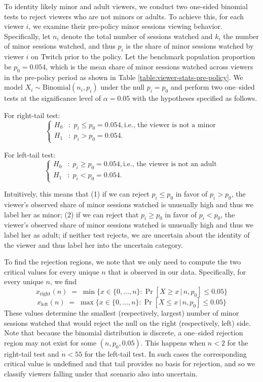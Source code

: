 \documentclass[a4paper,12pt]{article}
\begin{document}
To identity likely minor and adult viewers, we conduct two one-sided binomial tests to reject viewers who are not minors or adults. To achieve this, for each viewer $i$, we examine their pre-policy minor sessions viewing behavior. Specifically, let \(n_i\) denote the total number of sessions watched and \(k_i\) the number of minor sessions watched, and thus \(p_i\) is the share of minor sessions watched by viewer $i$ on Twitch prior to the policy. Let the benchmark population proportion be  \(p_0=0.054\), which is the mean share of minor sessions watched across viewers in the pre-policy period as shown in Table \ref{table:viewer-stats-pre-policy}. We model \(X_i\sim\mathrm{Binomial}(n_i,p_i)\) under the null \(p_i=p_0\) and perform two one–sided tests at the significance level of $\alpha=0.05$ with the hypotheses specified as follows.

For right-tail test: 
\[
\left\{
\begin{aligned}
H_0 &: \; p_i \le p_0 = 0.054, \text{i.e., the viewer is not a minor} \\
H_1 &: \; p_i >  p_0 = 0.054.
\end{aligned}
\right.
\]

For left-tail test: 
\[
\left\{
\begin{aligned}
H_0 &: \; p_i \ge p_0 = 0.054, \text{i.e., the viewer is not an adult}\\
H_1 &: \; p_i <  p_0 = 0.054.
\end{aligned}
\right.
\]

Intuitively, this means that (1) if we can reject $p_i \le p_0$ in favor of 
$p_i >  p_0$,  the viewer's observed share of minor sessions watched is unusually high and thus we label her as minor; (2) if we can reject that $p_i \ge p_0$ in favor of $p_i <  p_0$, the viewer's observed share of minor sessions watched is unusually high and thus we label her as adult; if neither test rejects, we are uncertain about the identity of the viewer and thus label her into the uncertain category. 

To find the rejection regions, we note that we only need to compute the two critical values for every unique $n$ that is observed in our data. Specifically, for every unique $n$, we find
\[
x_{\mathrm{right}}(n)\;=\;\min\big\{x\in\{0,\ldots,n\}:\Pr[X\ge x\,|\,n,p_0]\le 0.05\big\}
\]
\[
x_{\mathrm{left}}(n)\;=\;\max\big\{x\in\{0,\ldots,n\}:\Pr[X\le x\,|\,n,p_0]\le 0.05\big\}
\]
These values determine the smallest (respectively, largest) number of minor sessions watched that would reject the null on the right (respectively, left) side. Note that because the binomial distribution is discrete, a one–sided rejection region may not exist for some \((n,p_0,0.05)\). This happens when $n<2$ for the right-tail test and $n<55$ for the left-tail test. In such cases the corresponding critical value is undefined and that tail provides no basis for rejection, and so we classify viewers falling under that scenario also into uncertain. 
\end{document}
